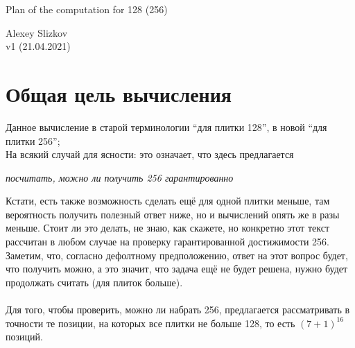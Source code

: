 \documentclass[12pt]{article}
\begin{document}
\begin{center} \LARGE Plan of the computation for 128 (256) \end{center}
\hspace*{\fill} Alexey Slizkov\\
\hspace*{\fill} v1 (21.04.2021)\\


\section{Общая цель вычисления}
Данное вычисление в старой терминологии ``для плитки 128'', в новой ``для плитки 256'';\\
На всякий случай для ясности: это означает, что здесь предлагается
\begin{center} \textit{посчитать, можно ли получить 256 гарантированно} \end{center}
Кстати, есть также возможность сделать ещё для одной плитки меньше, там вероятность получить полезный ответ ниже, но и вычислений опять же в разы меньше. Стоит ли это делать, не знаю, как скажете, но конкретно этот текст рассчитан в любом случае на проверку гарантированной достижимости 256.\\
Заметим, что, согласно дефолтному предположению, ответ на этот вопрос будет, что получить можно, а это значит, что задача ещё не будет решена, нужно будет продолжать считать (для плиток больше).\\\\
Для того, чтобы проверить, можно ли набрать 256, предлагается рассматривать в точности те позиции, на которых все плитки не больше 128, то есть $(7 + 1)^{16}$ позиций.\\
\clearpage
\end{document}
